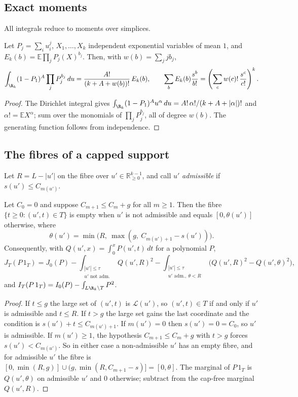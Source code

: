 \subsection*{Exact moments}
All integrals reduce to moments over simplices.

\begin{lemma}\label{lem:egf}
Let $P_j=\sum_iu_i^j$, $X_1,\dots,X_k$ independent exponential variables of
mean $1$, and $E_k(b)=\mathbb E\prod_jP_j(X)^{b_j}$. Then, with
$w(b)=\sum_jjb_j$,
\[
\int_{\R_k}(1-P_1)^A\prod_jP_j^{b_j}\,du=\frac{A!}{(k+A+w(b))!}\,E_k(b),
\qquad
\sum_bE_k(b)\frac{s^b}{b!}=\left(\sum_c w(c)!\,\frac{s^c}{c!}\right)^{k}.
\]
\end{lemma}

\begin{proof}
The Dirichlet integral gives $\int_{\R_k}(1-P_1)^Au^\alpha\,du=A!\,\alpha!/(k+A+|\alpha|)!$
and $\alpha!=\mathbb EX^\alpha$; sum over the monomials of $\prod_jP_j^{b_j}$,
all of degree $w(b)$. The generating function follows from independence.
\end{proof}

\subsection*{The fibres of a capped support}
Let $R=L-|u'|$ on the fibre over $u'\in\mathbb R^{k-1}_{\ge0}$, and call $u'$
\emph{admissible} if $s(u')\le C_{m(u')}$.

\begin{proposition}\label{prop:fibre}
Let $C_0=0$ and suppose $C_{m+1}\le C_m+g$ for all $m\ge1$. Then the fibre
$\{t\ge0:(u',t)\in T\}$ is empty when $u'$ is not admissible and equals
$[0,\theta(u')]$ otherwise, where
\[
\theta(u')=\min\bigl(R,\ \max(g,\ C_{m(u')+1}-s(u'))\bigr).
\]
Consequently, with $Q(u',x)=\int_0^xP(u',t)\,dt$ for a polynomial $P$,
\[
J_T(P\,1_T)=J_0(P)-\int_{\substack{|u'|\le\tau\\ u'\text{ not adm.}}}Q(u',R)^2
-\int_{\substack{|u'|\le\tau\\ u'\text{ adm.},\ \theta<R}}\bigl(Q(u',R)^2-Q(u',\theta)^2\bigr),
\]
and $I_T(P\,1_T)=I_0(P)-\int_{L\R_k\setminus T}P^2$.
\end{proposition}

\begin{proof}
If $t\le g$ the large set of $(u',t)$ is $\mathcal L(u')$, so $(u',t)\in T$ if and only
if $u'$ is admissible and $t\le R$. If $t>g$ the large set gains the last
coordinate and the condition is $s(u')+t\le C_{m(u')+1}$. If $m(u')=0$ then
$s(u')=0=C_0$, so $u'$ is admissible. If $m(u')\ge1$, the hypothesis
$C_{m+1}\le C_m+g$ with $t>g$ forces $s(u')<C_{m(u')}$. So in either case a
non-admissible $u'$ has an empty fibre, and for admissible $u'$ the fibre is
$[0,\min(R,g)]\cup(g,\min(R,C_{m+1}-s)]=[0,\theta]$. The marginal of $P\,1_T$ is
$Q(u',\theta)$ on admissible $u'$ and $0$ otherwise; subtract from the cap-free
marginal $Q(u',R)$.
\end{proof}

